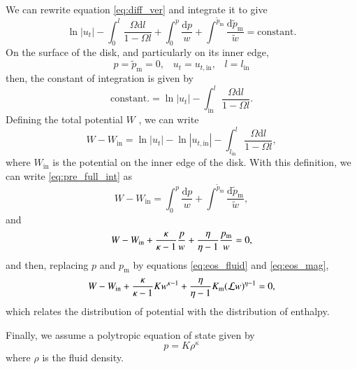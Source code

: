 \documentclass{aa}
\begin{document}
We can rewrite equation \eqref{eq:diff_ver} and integrate it to give
\begin{equation}\label{eq:pre_full_int}
\ln |u_t| - \int^l_0 \frac{\Omega \mathrm{d}l}{1 - \Omega l} + \int^p_0 \frac{\mathrm{d}p}{w} + \int^{\tilde{p}_{\mathrm{m}}} \frac{\mathrm{d}\tilde{p}_{\mathrm{m}}}{\tilde{w}} = \mathrm{constant}.
\end{equation}
On the surface of the disk, and particularly on its inner edge,
\begin{equation}
p = \tilde{p}_{\mathrm{m}} = 0, \;\;\; u_t = u_{t, \mathrm{in}}, \;\;\; l = l_{\mathrm{in}}
\end{equation}
then, the constant of integration is given by
\begin{equation}
\mathrm{constant.} = \ln |u_t| - \int^l_{\mathrm{in}} \frac{\Omega \mathrm{d}l}{1 - \Omega l}.
\end{equation}
Defining the total potential $W$ \citet{Abramowicz:1978}, we can write
\begin{equation}\label{eq:potential}
W - W_{\mathrm{in}} = \ln|u_t| - \ln|u_{t,\mathrm{in}}| - \int^{l}_{l_{\mathrm{in}}} \frac{\Omega \mathrm{d}l}{1 - \Omega l},
\end{equation}
where $W_{\mathrm{in}}$ is the potential on the inner edge of the disk. With this definition, we can write \eqref{eq:pre_full_int} as
\begin{equation}\label{eq:full_int}
W - W_{\mathrm{in}} = \int^p_0 \frac{\mathrm{d}p}{w} + \int^{\tilde{p}_{\mathrm{m}}} \frac{\mathrm{d}\tilde{p}_{\mathrm{m}}}{\tilde{w}},
\end{equation}
and
\begin{equation}\label{eq:pre_enthalpy_eq}
W - W_{\rm{in}} + \frac{\kappa}{\kappa - 1}\frac{p}{w} + \frac{\eta}{\eta - 1}\frac{p_{\mathrm{m}}}{w} = 0,
\end{equation}
and then, replacing $p$ and $p_{\mathrm{m}}$ by equations \eqref{eq:eos_fluid} and \eqref{eq:eos_mag},
\begin{equation}\label{eq:enthalpy_eq}
W - W_{\rm{in}} + \frac{\kappa}{\kappa - 1} K w^{\kappa - 1} + \frac{\eta}{\eta - 1}K_{\mathrm{m}}(\mathcal{L} w)^{\eta - 1} = 0,
\end{equation}
which relates the distribution of potential with the distribution of enthalpy.

Finally, we assume a polytropic equation of state given by
\begin{equation}\label{eq:density_eq}
p = K \rho^{\kappa}
\end{equation}
where $\rho$ is the fluid density.
\end{document}
